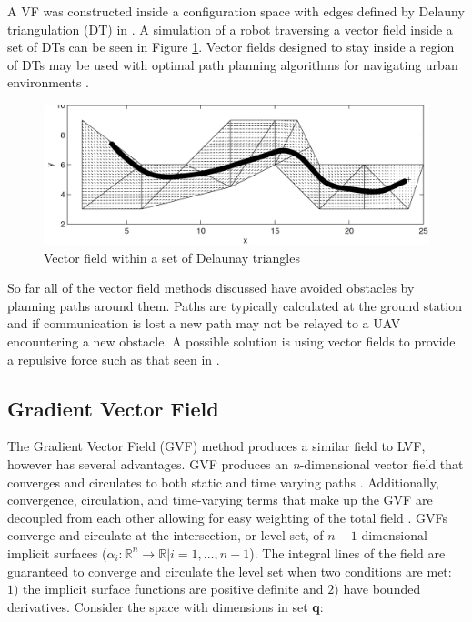 \documentclass[numbered,pdftex]{ohio-etd}
\begin{document}
A VF was constructed inside a configuration space with edges defined by Delauny triangulation (DT) in \cite{pimenta_fully_2007}.  A simulation of a robot traversing a vector field inside a set of DTs can be seen in Figure \ref{fig:cdtVF}. Vector fields designed to stay inside a region of DTs may be used with optimal path planning algorithms for navigating urban environments \cite{md_simplex_2017}.


\begin{figure}
	\centering
	\includegraphics[width=15cm]{PaperFigures/cdtVF}
	\caption{Vector field within a set of Delaunay triangles \cite{pimenta_fully_2007}}
	\label{fig:cdtVF}
\end{figure}

So far all of the vector field methods discussed have avoided obstacles by planning paths around them. Paths are typically calculated at the ground station and if communication is lost a new path may not be relayed to a UAV encountering a new obstacle. A possible solution is using vector fields to provide a repulsive force such as that seen in \cite{panagou_motion_2014,zhou_vector_2014,wilhelm_2019}. 

\subsection{Gradient Vector Field}
The Gradient Vector Field (GVF) method produces a similar field to LVF, however has several advantages. GVF produces an \textit{n}-dimensional vector field that converges and circulates to both static and time varying paths \cite{goncalves_artificial_2009}. Additionally, convergence, circulation, and time-varying terms that make up the GVF are decoupled from each other allowing for easy weighting of the total field \cite{goncalves_circulation_2010}. GVFs converge and circulate at the intersection, or level set, of $n-1$ dimensional implicit surfaces ($\alpha_i:\mathbb{R}^n\rightarrow\mathbb{R} | i=1,...,n-1$). The integral lines of the field are guaranteed to converge and circulate the level set when two conditions are met: $1)$ the implicit surface functions are positive definite and $2)$ have bounded derivatives. Consider the space with dimensions in set \textbf{q}:
\end{document}
